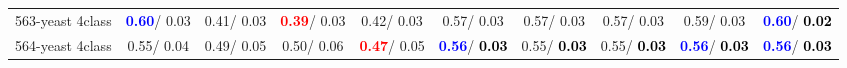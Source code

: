 \begin{table}[h]
\begin{center}
{\begin{tabular}{lc|c|c|c|c|c|c|c|c}
563-yeast 4class & \textcolor{blue}{\textbf{  0.60}}/  0.03 &   0.41/  0.03 & \textcolor{red}{\textbf{  0.39}}/  0.03 &   0.42/  0.03 &   0.57/  0.03 &   0.57/  0.03 &   0.57/  0.03 &   0.59/  0.03 & \textcolor{blue}{\textbf{  0.60}}/\textcolor{black}{\textbf{  0.02}} \\
564-yeast 4class &   0.55/  0.04 &   0.49/  0.05 &   0.50/  0.06 & \textcolor{red}{\textbf{  0.47}}/  0.05 & \textcolor{blue}{\textbf{  0.56}}/\textcolor{black}{\textbf{  0.03}} &   0.55/\textcolor{black}{\textbf{  0.03}} &   0.55/\textcolor{black}{\textbf{  0.03}} & \textcolor{blue}{\textbf{  0.56}}/\textcolor{black}{\textbf{  0.03}} & \textcolor{blue}{\textbf{  0.56}}/\textcolor{black}{\textbf{  0.03}} \\\end{tabular}}\label{stratsALCKappa17Allallb}
\end{center}
\end{table}
\clearpage